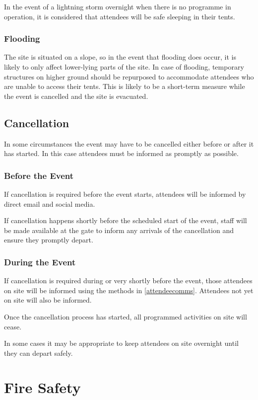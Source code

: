 In the event of a lightning storm overnight when there is no programme in operation, it is considered that
attendees will be safe sleeping in their tents.

\subsubsection{Flooding}

The site is situated on a slope, so in the event that flooding does occur, it is likely to
only affect lower-lying parts of the site. In case of flooding, temporary structures on higher
ground should be repurposed to accommodate attendees who are unable to access their tents. This
is likely to be a short-term measure while the event is cancelled and the site is evacuated.

\subsection{Cancellation}\label{cancellation}
In some circumstances the event may have to be cancelled either before or after it has
started. In this case attendees must be informed as promptly as possible.

\subsubsection{Before the Event}
If cancellation is required before the event starts, attendees will be informed by
direct email and social media.

If cancellation happens shortly before the scheduled start of the event, staff will
be made available at the gate to inform any arrivals of the cancellation and ensure
they promptly depart.

\subsubsection{During the Event}
If cancellation is required during or very shortly before the event, those attendees
on site will be informed using the methods in \cref{attendeecomms}. Attendees
not yet on site will also be informed.

Once the cancellation process has started, all programmed activities on site will
cease.

In some cases it may be appropriate to keep attendees on site overnight
until they can depart safely.

\newpage

\section{Fire Safety}\label{fire}

